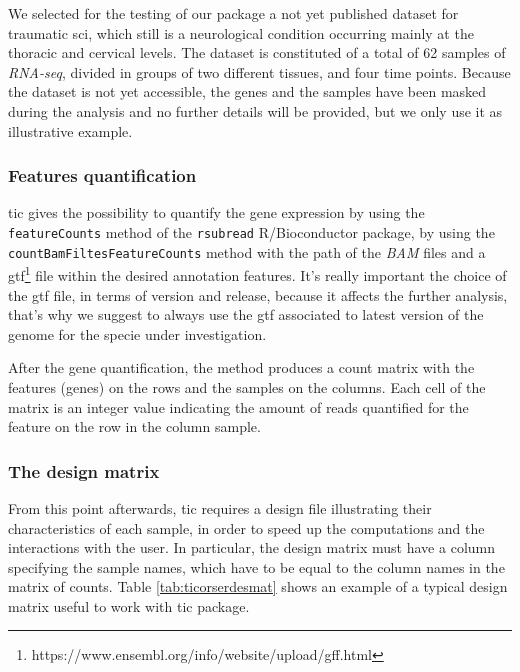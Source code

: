 We selected for the testing of our package a not yet published dataset for traumatic \gls{sci}, which still is a neurological condition occurring mainly at the thoracic and cervical levels.
The dataset is constituted of a total of 62 samples of \textit{RNA-seq}, divided in groups of two different tissues, and four time points.
Because the dataset is not yet accessible, the genes and the samples have been masked during the analysis and no further details will be provided, but we only use it as illustrative example.

\subsubsection{Features quantification}
\gls{tic} gives the possibility to quantify the gene expression by using the \lstinline!featureCounts! method of the \lstinline!rsubread! R/Bioconductor package, by using the \lstinline!countBamFiltesFeatureCounts! method with the path of the \textit{BAM} files and a \gls{gtf}\footnote{https://www.ensembl.org/info/website/upload/gff.html} file within the desired annotation features.
It's really important the choice of the \gls{gtf} file, in terms of version and release, because it affects the further analysis, that's why we suggest to always use the \gls{gtf} associated to latest version of the genome for the specie under investigation.

After the gene quantification, the method produces a count matrix with the features (genes) on the rows and the samples on the columns. 
Each cell of the matrix is an integer value indicating the amount of reads quantified for the feature on the row in the column sample. 

\subsubsection{The design matrix}
From this point afterwards, \gls{tic} requires a design file illustrating their characteristics of each sample, in order to speed up the computations and the interactions with the user.
In particular, the design matrix must have a column specifying the sample names, which have to be equal to the column names in the matrix of counts.
Table \ref{tab:ticorserdesmat} shows an example of a typical design matrix useful to work with \gls{tic} package.

